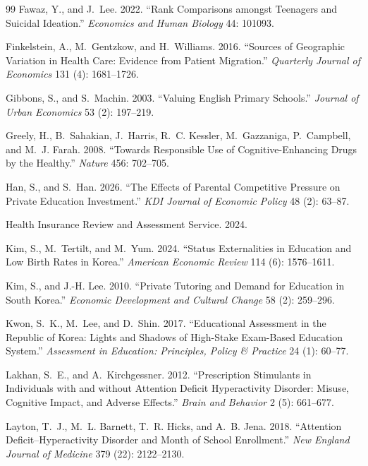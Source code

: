 \documentclass[12pt]{article}
\begin{document}
\begin{thebibliography}{99}
Fawaz, Y., and J.~Lee. 2022. ``Rank Comparisons amongst Teenagers and Suicidal Ideation.'' \textit{Economics and Human Biology} 44: 101093.

Finkelstein, A., M.~Gentzkow, and H.~Williams. 2016. ``Sources of Geographic Variation in Health Care: Evidence from Patient Migration.'' \textit{Quarterly Journal of Economics} 131 (4): 1681--1726.

Gibbons, S., and S.~Machin. 2003. ``Valuing English Primary Schools.'' \textit{Journal of Urban Economics} 53 (2): 197--219.

Greely, H., B.~Sahakian, J.~Harris, R.~C. Kessler, M.~Gazzaniga, P.~Campbell, and M.~J. Farah. 2008. ``Towards Responsible Use of Cognitive-Enhancing Drugs by the Healthy.'' \textit{Nature} 456: 702--705.

Han, S., and S.~Han. 2026. ``The Effects of Parental Competitive Pressure on Private Education Investment.'' \textit{KDI Journal of Economic Policy} 48 (2): 63--87.

Health Insurance Review and Assessment Service. 2024.

Kim, S., M.~Tertilt, and M.~Yum. 2024. ``Status Externalities in Education and Low Birth Rates in Korea.'' \textit{American Economic Review} 114 (6): 1576--1611.

Kim, S., and J.-H. Lee. 2010. ``Private Tutoring and Demand for Education in South Korea.'' \textit{Economic Development and Cultural Change} 58 (2): 259--296.

Kwon, S.~K., M.~Lee, and D.~Shin. 2017. ``Educational Assessment in the Republic of Korea: Lights and Shadows of High-Stake Exam-Based Education System.'' \textit{Assessment in Education: Principles, Policy \& Practice} 24 (1): 60--77.

Lakhan, S.~E., and A.~Kirchgessner. 2012. ``Prescription Stimulants in Individuals with and without Attention Deficit Hyperactivity Disorder: Misuse, Cognitive Impact, and Adverse Effects.'' \textit{Brain and Behavior} 2 (5): 661--677.

Layton, T.~J., M.~L. Barnett, T.~R. Hicks, and A.~B. Jena. 2018. ``Attention Deficit--Hyperactivity Disorder and Month of School Enrollment.'' \textit{New England Journal of Medicine} 379 (22): 2122--2130.


\end{thebibliography}
\end{document}
